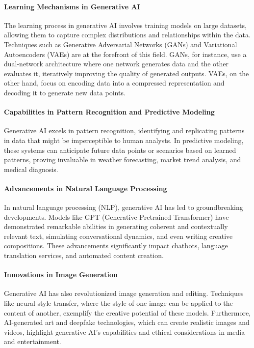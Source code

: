 \documentclass{article}
\begin{document}
\paragraph{Learning Mechanisms in Generative AI}
The learning process in generative AI involves training models on large datasets, allowing them to capture complex distributions and relationships within the data. Techniques such as Generative Adversarial Networks (GANs) and Variational Autoencoders (VAEs) are at the forefront of this field. GANs, for instance, use a dual-network architecture where one network generates data and the other evaluates it, iteratively improving the quality of generated outputs. VAEs, on the other hand, focus on encoding data into a compressed representation and decoding it to generate new data points.

\paragraph{Capabilities in Pattern Recognition and Predictive Modeling}
Generative AI excels in pattern recognition, identifying and replicating patterns in data that might be imperceptible to human analysts. In predictive modeling, these systems can anticipate future data points or scenarios based on learned patterns, proving invaluable in weather forecasting, market trend analysis, and medical diagnosis.

\paragraph{Advancements in Natural Language Processing}
In natural language processing (NLP), generative AI has led to groundbreaking developments. Models like GPT (Generative Pretrained Transformer) have demonstrated remarkable abilities in generating coherent and contextually relevant text, simulating conversational dynamics, and even writing creative compositions. These advancements significantly impact chatbots, language translation services, and automated content creation.

\paragraph{Innovations in Image Generation}
Generative AI has also revolutionized image generation and editing. Techniques like neural style transfer, where the style of one image can be applied to the content of another, exemplify the creative potential of these models. Furthermore, AI-generated art and deepfake technologies, which can create realistic images and videos, highlight generative AI's capabilities and ethical considerations in media and entertainment.
\end{document}
